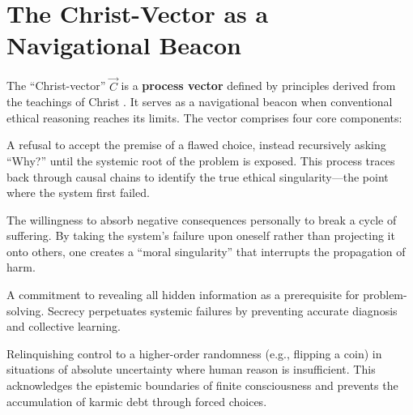 \documentclass[11pt,a4paper]{article}
\begin{document}
\section{The Christ-Vector as a Navigational Beacon}
The ``Christ-vector'' $\vec{C}$ is a \textbf{process vector} defined by principles derived from the teachings of Christ \citep{new_testament}. It serves as a navigational beacon when conventional ethical reasoning reaches its limits. The vector comprises four core components:

\begin{description}[style=nextline]
    \item[\textbf{Root-Cause Analysis (Uncovering the Ethical Singularity)}] A refusal to accept the premise of a flawed choice, instead recursively asking ``Why?'' until the systemic root of the problem is exposed. This process traces back through causal chains to identify the true ethical singularity—the point where the system first failed.
    
    \item[\textbf{Radical Self-Sacrifice}] The willingness to absorb negative consequences personally to break a cycle of suffering. By taking the system's failure upon oneself rather than projecting it onto others, one creates a ``moral singularity'' that interrupts the propagation of harm.
    
    \item[\textbf{Radical Honesty and Transparency}] A commitment to revealing all hidden information as a prerequisite for problem-solving. Secrecy perpetuates systemic failures by preventing accurate diagnosis and collective learning.
    
    \item[\textbf{Trust in Providence}] Relinquishing control to a higher-order randomness (e.g., flipping a coin) in situations of absolute uncertainty where human reason is insufficient. This acknowledges the epistemic boundaries of finite consciousness and prevents the accumulation of karmic debt through forced choices.
\end{description}
\end{document}
